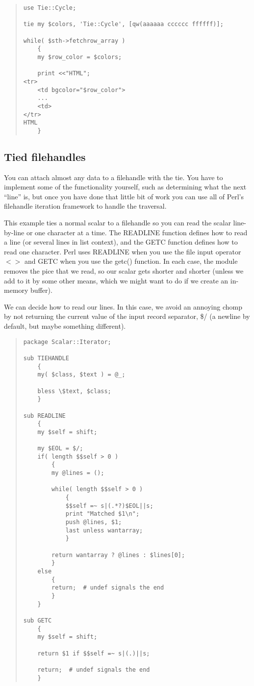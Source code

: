 \begin{quote}
\begin{verbatim}
use Tie::Cycle;

tie my $colors, 'Tie::Cycle', [qw(aaaaaa cccccc ffffff)];

while( $sth->fetchrow_array )
    {
    my $row_color = $colors;
    
    print <<"HTML";
<tr>
    <td bgcolor="$row_color">
    ...
    <td>
</tr>
HTML
    }
\end{verbatim}
\end{quote}

    \subsection{Tied filehandles}

You can attach almost any data to a filehandle with the tie.  You
have to implement some of the functionality yourself, such as
determining what the next ``line'' is, but once you have done
that little bit of work you can use all of Perl's filehandle
iteration framework to handle the traversal.

This example ties a normal scalar to a filehandle so you
can read the scalar line-by-line or one character at a time.
The READLINE function defines how to read a line (or several
lines in list context), and the GETC function defines how
to read one character.  Perl uses READLINE when you use the
file input operator $<>$ and GETC when you use the getc()
function.  In each case, the module removes the pice that
we read, so our scalar gets shorter and shorter (unless we
add to it by some other means, which we might want to do
if we create an in-memory buffer).

We can decide how to read our lines.  In this case, we avoid
an annoying chomp by not returning the current value of the
input record separator, \$/ (a newline by default, but maybe
something different).

\begin{quote}
\begin{verbatim}
package Scalar::Iterator;

sub TIEHANDLE
    {
    my( $class, $text ) = @_;
    
    bless \$text, $class;
    }
        
sub READLINE
    {
    my $self = shift;
    
    my $EOL = $/;
    if( length $$self > 0 )
        {
        my @lines = ();
        
        while( length $$self > 0 )
            {
            $$self =~ s|(.*?)$EOL||s;
            print "Matched $1\n";
            push @lines, $1;
            last unless wantarray;
            }

        return wantarray ? @lines : $lines[0];            
        }
    else
        {    
        return;  # undef signals the end
        }
    }
    
sub GETC
    {
    my $self = shift;
    
    return $1 if $$self =~ s|(.)||s;
    
    return;  # undef signals the end
    }
\end{verbatim}
\end{quote}

